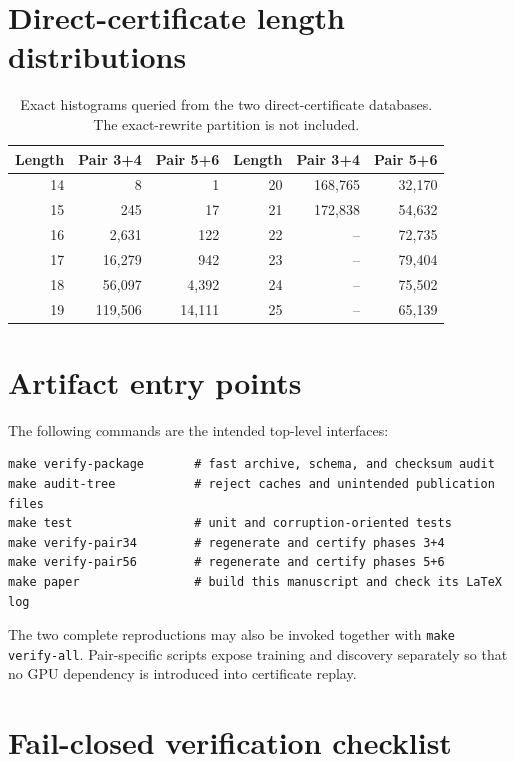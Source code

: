 \section{Direct-certificate length distributions}
\label{app:word-lengths}

\begin{table}[!ht]
\centering
\caption{Exact histograms queried from the two direct-certificate databases.
The exact-rewrite partition is not included.}
\label{tab:direct-length-histograms}
\small
\begin{tabular}{@{}rrr@{\qquad}rrr@{}}
\toprule
Length & Pair 3+4 & Pair 5+6 & Length & Pair 3+4 & Pair 5+6\\
\midrule
14 & 8 & 1      & 20 & 168,765 & 32,170\\
15 & 245 & 17   & 21 & 172,838 & 54,632\\
16 & 2,631 & 122 & 22 & -- & 72,735\\
17 & 16,279 & 942 & 23 & -- & 79,404\\
18 & 56,097 & 4,392 & 24 & -- & 75,502\\
19 & 119,506 & 14,111 & 25 & -- & 65,139\\
\bottomrule
\end{tabular}
\end{table}

\section{Artifact entry points}
\label{app:commands}

The following commands are the intended top-level interfaces:
\begin{lstlisting}
make verify-package       # fast archive, schema, and checksum audit
make audit-tree           # reject caches and unintended publication files
make test                 # unit and corruption-oriented tests
make verify-pair34        # regenerate and certify phases 3+4
make verify-pair56        # regenerate and certify phases 5+6
make paper                # build this manuscript and check its LaTeX log
\end{lstlisting}
The two complete reproductions may also be invoked together with
\texttt{make verify-all}.  Pair-specific scripts expose training and discovery
separately so that no GPU dependency is introduced into certificate replay.

\clearpage
\section{Fail-closed verification checklist}
\label{app:threats}

